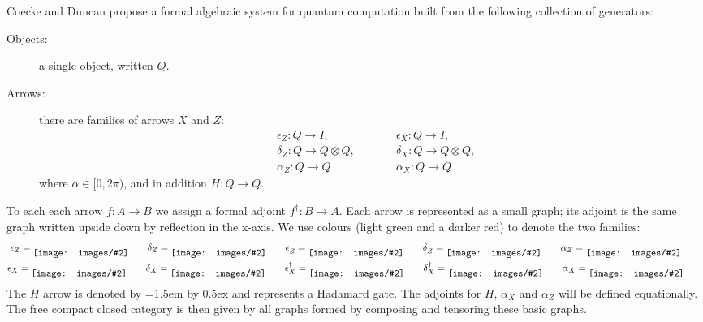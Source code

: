 \documentclass[runningheads]{llncs}
\newcommand{\inlinegraphic}[2]{
  \dimendef\grafheight=255\dimendef\grafvshift=254
  \grafheight=#1
  \grafvshift=-0.5\grafheight
  \advance\grafvshift by 0.5ex
  \raisebox{\grafvshift}{\texttt{[image: images/\#2]}\xspace}
}
\begin{document}
Coecke and Duncan \cite{Coecke:2008jo} propose a formal algebraic
system for quantum computation built from the following collection of
generators:  
\begin{description}
\item[Objects:] a single object, written $Q$.
\item[Arrows:] there are families of arrows $X$ and $Z$:
  \begin{align*}
  &\epsilon_Z : Q \to I, &\qquad&  \epsilon_X : Q \to I,\\
  &\delta_Z : Q \to Q \otimes Q, && \delta_X : Q \to Q \otimes Q, \\
  &\alpha_Z : Q \to Q &&  \alpha_X : Q \to Q   
  \end{align*}
  where $\alpha \in [0,2\pi)$, and in addition $H:Q\to Q$.
\end{description}
To each each arrow $f : A\to B$ we assign a formal adjoint $f^\dag : B
\to A$.  Each arrow is represented as a small graph; its adjoint is
the same graph written upside down by reflection in the x-axis.  We
use colours (light green and a darker red) to denote the two families:
\begin{gather*}
  \epsilon_Z = \inlinegraphic{1.5em}{epsilon} \qquad
  \delta_Z = \inlinegraphic{1.5em}{delta} \qquad
  \epsilon_Z^\dag = \inlinegraphic{1.5em}{epsilondag} \qquad
  \delta_Z^\dag = \inlinegraphic{1.5em}{deltadag} \qquad
  \alpha_Z = \inlinegraphic{1.5em}{greenalpha} \qquad
\\  
  \epsilon_X = \inlinegraphic{1.5em}{redepsilon} \qquad
  \delta_X = \inlinegraphic{1.5em}{reddelta} \qquad
  \epsilon_X^\dag = \inlinegraphic{1.5em}{redepsilondag} \qquad
  \delta_X^\dag = \inlinegraphic{1.5em}{reddeltadag} \qquad
  \alpha_X = \inlinegraphic{1.5em}{redalpha} \qquad
\end{gather*}
The $H$ arrow is denoted by \inlinegraphic{1.5em}{H} and represents a
Hadamard gate. The adjoints for $H$, $\alpha_X$ and
$\alpha_Z$ will be defined equationally.  The free compact closed
category is then given by all graphs formed by composing and tensoring
these basic graphs.
\end{document}
